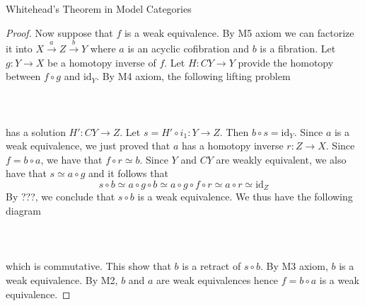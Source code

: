 \documentclass[a4paper]{article}
\begin{document}
\begin{thm}{Whitehead's Theorem in Model Categories}{}
\begin{proof}
Now suppose that $f$ is a weak equivalence. By M5 axiom we can factorize it into $X\overset{a}{\longrightarrow}Z\overset{b}{\longrightarrow}Y$ where $a$ is an acyclic cofibration and $b$ is a fibration. Let $g:Y\to X$ be a homotopy inverse of $f$. Let $H:CY\to Y$ provide the homotopy between $f\circ g$ and $\text{id}_Y$. By M4 axiom, the following lifting problem \\~\\
\\~\\ 
has a solution $H':CY\to Z$. Let $s=H'\circ i_1:Y\to Z$. Then $b\circ s=\text{id}_Y$. Since $a$ is a weak equivalence, we just proved that $a$ has a homotopy inverse $r:Z\to X$. Since $f=b\circ a$, we have that $f\circ r\simeq b$. Since $Y$ and $CY$ are weakly equivalent, we also have that $s\simeq a\circ g$ and it follows that $$s\circ b\simeq a\circ g\circ b\simeq a\circ g\circ f\circ r\simeq a\circ r\simeq\text{id}_Z$$ By ???, we conclude that $s\circ b$ is a weak equivalence. We thus have the following diagram \\~\\
\\~\\ 
which is commutative. This show that $b$ is a retract of $s\circ b$. By M3 axiom, $b$ is a weak equivalence. By M2, $b$ and $a$ are weak equivalences hence $f=b\circ a$ is a weak equivalence. 
\end{proof}
\end{thm}
\end{document}
